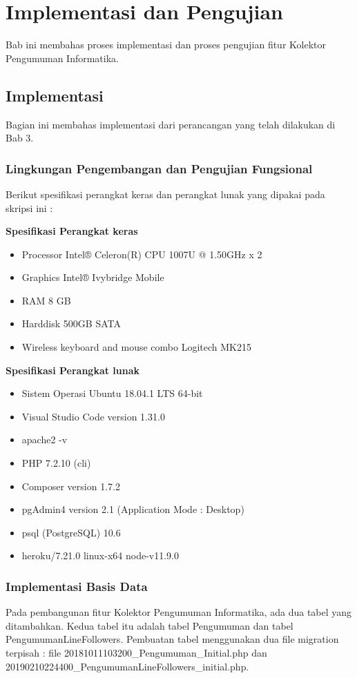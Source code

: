 
\chapter{Implementasi dan Pengujian}
\label{chap:implementasiDanPengujian}

Bab ini membahas proses implementasi dan proses pengujian fitur Kolektor Pengumuman Informatika.
\section{Implementasi}
Bagian ini membahas implementasi dari perancangan yang telah dilakukan di Bab 3.
\subsection{Lingkungan Pengembangan dan Pengujian Fungsional}
Berikut spesifikasi perangkat keras dan perangkat lunak yang dipakai pada skripsi ini :

\textbf{Spesifikasi Perangkat keras}
\begin{itemize}
\item Processor Intel® Celeron(R) CPU 1007U @ 1.50GHz x 2 
\item Graphics Intel® Ivybridge Mobile
\item RAM 8 GB
\item Harddisk 500GB SATA
\item Wireless keyboard and mouse combo Logitech MK215
\end{itemize}

\textbf{Spesifikasi Perangkat lunak}
\begin{itemize}
\item Sistem Operasi Ubuntu 18.04.1 LTS 64-bit
\item Visual Studio Code version 1.31.0
\item apache2 -v
\item PHP 7.2.10 (cli)
\item Composer version 1.7.2
\item pgAdmin4 version 2.1 (Application Mode : Desktop)
\item psql (PostgreSQL) 10.6
\item heroku/7.21.0 linux-x64 node-v11.9.0
\end{itemize}

\subsection{Implementasi Basis Data}
Pada pembangunan fitur Kolektor Pengumuman Informatika, ada dua tabel yang ditambahkan. Kedua tabel itu adalah tabel Pengumuman dan tabel PengumumanLineFollowers. Pembuatan tabel menggunakan dua file migration terpisah : file 20181011103200\_Pengumuman\_Initial.php dan 20190210224400\_PengumumanLineFollowers\_initial.php.

